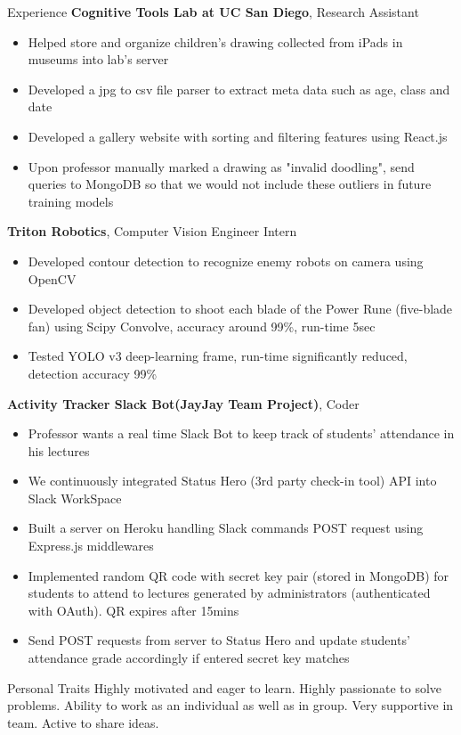\documentclass{resume} %
\begin{document}
\begin{rSection}{Experience}
{\bf Cognitive Tools Lab at UC San Diego}, Research Assistant
\vspace{-0.1cm}
\begin{itemize} [noitemsep]
\item Helped store and organize children's drawing collected from iPads in museums into lab's server
\item Developed a jpg to csv file parser to extract meta data such as age, class and date
\item Developed a gallery website with sorting and filtering features using React.js
\item Upon professor manually marked a drawing as "invalid doodling", send queries to MongoDB so that we would not include these outliers in future training models
\end{itemize}

{\bf Triton Robotics}, Computer Vision Engineer Intern
\vspace{-0.1cm}
\begin{itemize} [noitemsep]
\item Developed contour detection to recognize enemy robots on camera using OpenCV
\item Developed object detection to shoot each blade of the Power Rune (five-blade fan) using Scipy Convolve, accuracy around 99\%, run-time 5sec
\item Tested YOLO v3 deep-learning frame, run-time significantly reduced, detection accuracy 99\%
\end{itemize}

{\bf Activity Tracker Slack Bot(JayJay Team Project)}, Coder
\vspace{-0.1cm}
\begin{itemize} [noitemsep]
\item Professor wants a real time Slack Bot to keep track of students' attendance in his lectures 
\item We continuously integrated Status Hero (3rd party check-in tool) API into Slack WorkSpace 
\item Built a server on Heroku handling Slack commands POST request using Express.js middlewares
\item Implemented random QR code with secret key pair (stored in MongoDB) for students to attend to lectures generated by administrators (authenticated with OAuth). QR expires after 15mins
\item Send POST requests from server to Status Hero and update students' attendance grade accordingly if entered secret key matches 
\end{itemize}
\end{rSection}

\begin{rSection}{Personal Traits}
Highly motivated and eager to learn. Highly passionate to solve problems. Ability to work as an individual as well as in group. Very supportive in team. Active to share ideas. 
\end{rSection}
\end{document}
